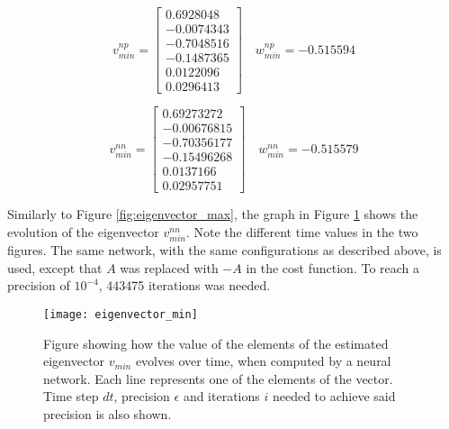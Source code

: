 \begin{equation*}
  v_{min}^{np} = \begin{bmatrix}
   0.6928048 \\
  -0.0074343 \\
  -0.7048516 \\
  -0.1487365 \\
  0.0122096 \\
  0.0296413
  \end{bmatrix} \quad w_{min}^{np} = -0.515594
\end{equation*}

\begin{equation*}
  v_{min}^{nn} = \begin{bmatrix}
   0.69273272 \\
   -0.00676815 \\
   -0.70356177 \\
   -0.15496268  \\
   0.0137166   \\
   0.02957751
  \end{bmatrix} \quad w_{min}^{nn} =  -0.515579  
\end{equation*}

Similarly to Figure \ref{fig:eigenvector_max}, the graph in Figure \ref{fig:eigenvector_min} shows the evolution of the eigenvector $v_{min}^{nn}$. Note the different time values in the two figures. The same network, with the same configurations as described above, is used, except that $A$ was replaced with $-A$ in the cost function. To reach a precision of $10^{-4}$, 443475 iterations was needed. 

\begin{figure}[htbp]
 \centering
 \texttt{[image: eigenvector\_min]}
 \caption{Figure showing how the value of the elements of the estimated eigenvector $v_{min}$ evolves over time, when computed by a neural network. Each line represents one of the elements of the vector. Time step $dt$, precision $\epsilon$ and iterations $i$ needed to achieve said precision is also shown.}
 \label{fig:eigenvector_min}
\end{figure}

